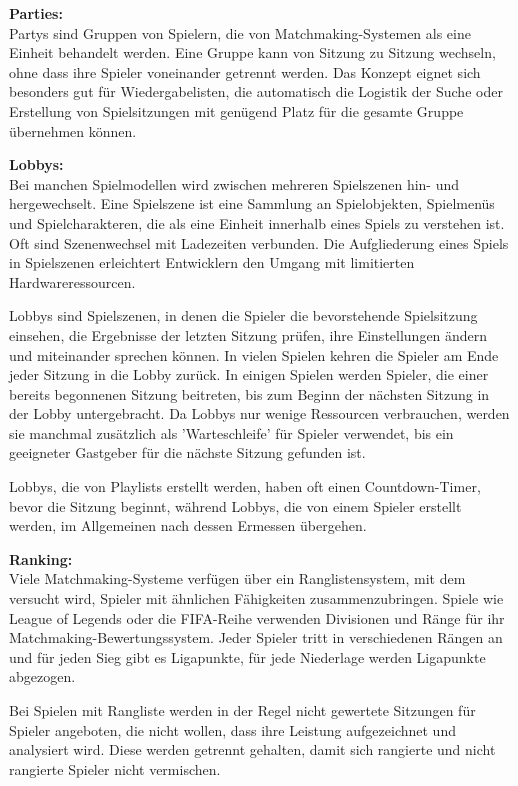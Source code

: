 \textbf{Parties:} \\
Partys sind Gruppen von Spielern, die von Matchmaking-Systemen als eine Einheit behandelt werden. Eine Gruppe kann von Sitzung zu Sitzung wechseln, ohne dass ihre Spieler voneinander getrennt werden. Das Konzept eignet sich besonders gut für Wiedergabelisten, die automatisch die Logistik der Suche oder Erstellung von Spielsitzungen mit genügend Platz für die gesamte Gruppe übernehmen können.

\cite{Wikipedia.2021b} 

\textbf{Lobbys:} \\
Bei manchen Spielmodellen wird zwischen mehreren Spielszenen hin- und hergewechselt. Eine Spielszene ist eine Sammlung an Spielobjekten, Spielmenüs und Spielcharakteren, die als eine Einheit innerhalb eines Spiels zu verstehen ist. Oft sind Szenenwechsel mit Ladezeiten verbunden. Die Aufgliederung eines Spiels in Spielszenen erleichtert Entwicklern den Umgang mit limitierten Hardwareressourcen. \cite{Wikipedia.2012}

Lobbys sind Spielszenen, in denen die Spieler die bevorstehende Spielsitzung einsehen, die Ergebnisse der letzten Sitzung prüfen, ihre Einstellungen ändern und miteinander sprechen können. In vielen Spielen kehren die Spieler am Ende jeder Sitzung in die Lobby zurück. In einigen Spielen werden Spieler, die einer bereits begonnenen Sitzung beitreten, bis zum Beginn der nächsten Sitzung in der Lobby untergebracht. Da Lobbys nur wenige Ressourcen verbrauchen, werden sie manchmal zusätzlich als 'Warteschleife' für Spieler verwendet, bis ein geeigneter Gastgeber für die nächste Sitzung gefunden ist.

Lobbys, die von Playlists erstellt werden, haben oft einen Countdown-Timer, bevor die Sitzung beginnt, während Lobbys, die von einem Spieler erstellt werden, im Allgemeinen nach dessen Ermessen übergehen.

\cite{Wikipedia.2021b}

\textbf{Ranking:} \\
Viele Matchmaking-Systeme verfügen über ein Ranglistensystem, mit dem versucht wird, Spieler mit ähnlichen Fähigkeiten zusammenzubringen. Spiele wie League of Legends oder die FIFA-Reihe verwenden Divisionen und Ränge für ihr Matchmaking-Bewertungssystem. Jeder Spieler tritt in verschiedenen Rängen an und für jeden Sieg gibt es Ligapunkte, für jede Niederlage werden Ligapunkte abgezogen.

Bei Spielen mit Rangliste werden in der Regel nicht gewertete Sitzungen für Spieler angeboten, die nicht wollen, dass ihre Leistung aufgezeichnet und analysiert wird. Diese werden getrennt gehalten, damit sich rangierte und nicht rangierte Spieler nicht vermischen.

